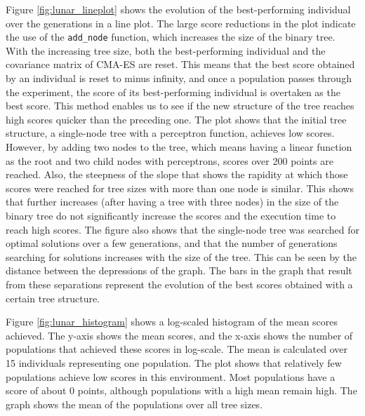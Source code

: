 Figure \ref{fig:lunar_lineplot} shows the evolution of the best-performing individual over the generations in a line plot. The large score reductions in the plot indicate the use of the \texttt{add\_node} function, which increases the size of the binary tree. With the increasing tree size, both the best-performing individual and the covariance matrix of CMA-ES are reset. This means that the best score obtained by an individual is reset to minus infinity, and once a population passes through the experiment, the score of its best-performing individual is overtaken as the best score. This method enables us to see if the new structure of the tree reaches high scores quicker than the preceding one. The plot shows that the initial tree structure, a single-node tree with a perceptron function, achieves low scores. However, by adding two nodes to the tree, which means having a linear function as the root and two child nodes with perceptrons, scores over 200 points are reached. Also, the steepness of the slope that shows the rapidity at which those scores were reached for tree sizes with more than one node is similar. This shows that further increases (after having a tree with three nodes) in the size of the binary tree do not significantly increase the scores and the execution time to reach high scores. The figure also shows that the single-node tree was searched for optimal solutions over a few generations, and that the number of generations searching for solutions increases with the size of the tree. This can be seen by the distance between the depressions of the graph. The bars in the graph that result from these separations represent the evolution of the best scores obtained with a certain tree structure.

Figure \ref{fig:lunar_histogram} shows a log-scaled histogram of the mean scores achieved. The y-axis shows the mean scores, and the x-axis shows the number of populations that achieved these scores in log-scale. The mean is calculated over 15 individuals representing one population. The plot shows that relatively few populations achieve low scores in this environment. Most populations have a score of about 0 points, although populations with a high mean remain high. The graph shows the mean of the populations over all tree sizes.

